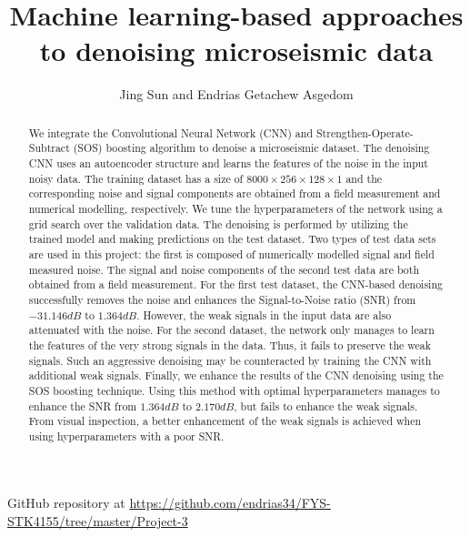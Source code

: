 \documentclass[a4paper]{article}
\begin{document}
\title{Machine learning-based approaches to denoising microseismic data}
\author{Jing Sun and Endrias Getachew Asgedom}

\maketitle
\begin{abstract}

We integrate the Convolutional Neural Network (CNN) and Strengthen-Operate-Subtract (SOS) boosting algorithm to denoise a microseismic dataset. The denoising CNN uses an autoencoder structure and learns the features of the noise in the input noisy data. The training dataset has a size of $8000\times256\times128\times1$ and the corresponding noise and signal components are obtained from a field measurement and numerical modelling, respectively. We tune the hyperparameters of the network using a grid search over the validation data. The denoising is performed by utilizing the trained model and making predictions on the test dataset. Two types of test data sets are used in this project: the first is composed of numerically modelled signal and field measured noise. The signal and noise components of the second test data are both obtained from a field measurement. For the first test dataset, the CNN-based denoising successfully removes the noise and enhances the Signal-to-Noise ratio (SNR) from $-31.146dB$ to $1.364dB$. However, the weak signals in the input data are also attenuated with the noise. For the second dataset, the network only manages to learn the features of the very strong signals in the data. Thus, it fails to preserve the weak signals. Such an aggressive denoising may be counteracted by training the CNN with additional weak signals. Finally, we enhance the results of the CNN denoising using the SOS boosting technique. Using this method with optimal hyperparameters manages to enhance the SNR from $1.364dB$ to $2.170dB$, but fails to enhance the weak signals. From visual inspection, a better enhancement of the weak signals is achieved when using hyperparameters with a poor SNR.


\noindent
\end{abstract}
\newpage

\tableofcontents

\begin{center}
    GitHub repository at \url{https://github.com/endrias34/FYS-STK4155/tree/master/Project-3}
\end{center}
\end{document}
